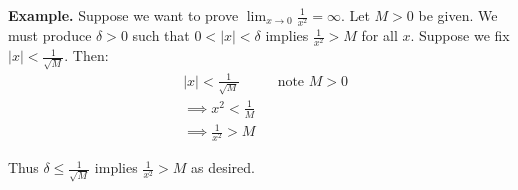 \vs

\textbf{Example.} Suppose we want to prove $\lim_{x\to0}\frac{1}{x^{2}}=\infty$. Let
$M>0$ be given. We must produce $\delta>0$ such that $0<|x|<\delta$ implies
$\frac{1}{x^2}>M$ for all $x$. Suppose we fix
$|x|<\frac{1}{\sqrt{M}}$. Then:
\begin{align*}
  &|x|<\frac{1}{\sqrt{M}}&&\text{note $M>0$}\\
  &\implies x^2<\frac{1}{M}\\
  &\implies \frac{1}{x^2}>M
\end{align*}

Thus $\delta\leq \frac{1}{\sqrt{M}}$ implies $\frac{1}{x^2}>M$ as desired.

